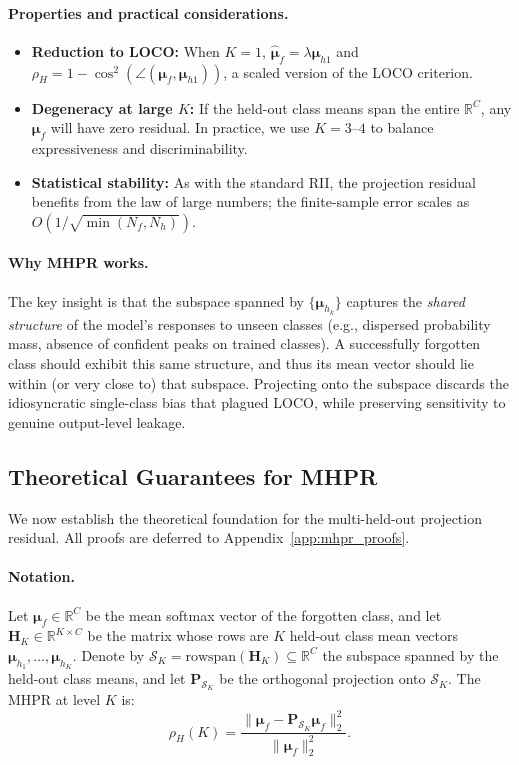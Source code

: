 \documentclass[journal]{IEEEtran}
\theoremstyle{definition}
\begin{document}
\paragraph{Properties and practical considerations.}
\begin{itemize}
\item \textbf{Reduction to LOCO:} When $K=1$, $\hat{\boldsymbol{\mu}}_f = \lambda \boldsymbol{\mu}_{h1}$ and $\rho_H = 1 - \cos^2(\angle(\boldsymbol{\mu}_f, \boldsymbol{\mu}_{h1}))$, a scaled version of the LOCO criterion.
\item \textbf{Degeneracy at large $K$:} If the held-out class means span the entire $\mathbb{R}^C$, any $\boldsymbol{\mu}_f$ will have zero residual. In practice, we use $K=3$--$4$ to balance expressiveness and discriminability.
\item \textbf{Statistical stability:} As with the standard RII, the projection residual benefits from the law of large numbers; the finite-sample error scales as $O(1/\sqrt{\min(N_f, N_h)})$.
\end{itemize}

\paragraph{Why MHPR works.}
The key insight is that the subspace spanned by $\{\boldsymbol{\mu}_{h_k}\}$ captures the \emph{shared structure} of the model's responses to unseen classes (e.g., dispersed probability mass, absence of confident peaks on trained classes). A successfully forgotten class should exhibit this same structure, and thus its mean vector should lie within (or very close to) that subspace. Projecting onto the subspace discards the idiosyncratic single-class bias that plagued LOCO, while preserving sensitivity to genuine output-level leakage.

\subsection{Theoretical Guarantees for MHPR}
\label{sec:mhpr_theory}

We now establish the theoretical foundation for the multi-held-out projection residual. All proofs are deferred to Appendix~\ref{app:mhpr_proofs}.

\paragraph{Notation.}
Let $\boldsymbol{\mu}_f \in \mathbb{R}^C$ be the mean softmax vector of the forgotten class, and let $\mathbf{H}_K \in \mathbb{R}^{K \times C}$ be the matrix whose rows are $K$ held-out class mean vectors $\boldsymbol{\mu}_{h_1},\dots,\boldsymbol{\mu}_{h_K}$. Denote by $\mathcal{S}_K = \mathrm{rowspan}(\mathbf{H}_K) \subseteq \mathbb{R}^C$ the subspace spanned by the held-out class means, and let $\mathbf{P}_{\mathcal{S}_K}$ be the orthogonal projection onto $\mathcal{S}_K$. The MHPR at level $K$ is:
\begin{equation}
\rho_H(K) = \frac{\|\boldsymbol{\mu}_f - \mathbf{P}_{\mathcal{S}_K}\boldsymbol{\mu}_f\|_2^2}{\|\boldsymbol{\mu}_f\|_2^2}.
\end{equation}
\end{document}
